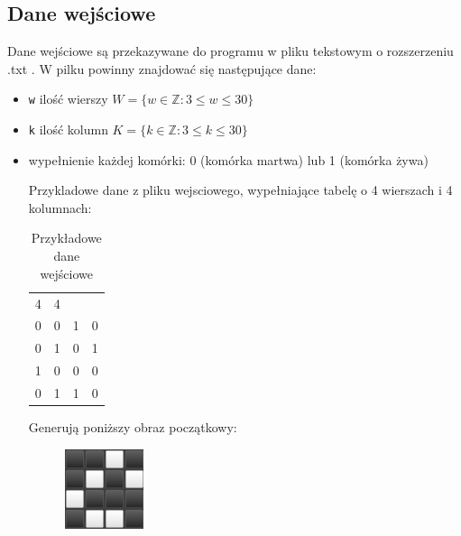 \documentclass[a4paper]{article}
\begin{document}
\subsection{Dane wej\'sciowe}
\quad Dane wej\'sciowe s\k{a} przekazywane do programu w pliku tekstowym o rozszerzeniu .txt . W pilku powinny znajdowa\'c si\k{e} nast\k{e}puj\k{a}ce dane: 
\begin{itemize}
	\item \texttt{w} ilo\'s\'c wierszy $W = \{ w \in \mathbb{Z} : 3 \leq w \leq 30 \} $
	\item \texttt{k} ilo\'s\'c kolumn $K = \{ k \in \mathbb{Z} : 3 \leq k \leq 30 \} $
	\item wype\l{}nienie ka\.zdej kom\'orki: 0 (kom\'orka martwa) lub 1 (kom\'orka \.zywa)
		
		Przykladowe dane z pliku wejsciowego, wype\l{}niaj\k{a}ce tabel\k{e} o 4 wierszach i 4 kolumnach:
		\begin{table}[h!]
		\begin{center}
			\begin{tabular}{c c c c}
				4 & 4         \\
				0 & 0 & 1 & 0 \\
				0 & 1 & 0 & 1 \\
				1 & 0 & 0 & 0 \\
				0 & 1 & 1 & 0 \\
			\end{tabular}
			{\color{gray}\caption{Przyk\l{}adowe dane wej\'sciowe}}
			
			\label{table:tab1}
		\end{center}
		\end{table}

		Generuj\k{a} poni\.zszy obraz pocz\k{a}tkowy:

		\begin{figure}[h]
			\centering
			\includegraphics{obraz}
		\end{figure}
\end{itemize}
\end{document}
